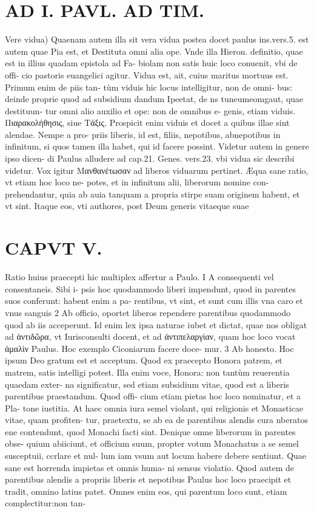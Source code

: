\documentclass{article}
\begin{document}
\begin{pages}
\section*{AD I. PAVL. AD TIM. }
\marginpar{[ p.254 ]}\pstart Vere vidua) Quaenam autem illa sit vera vidua postea docet paulus ins.vers.5. est autem quae Pia est, et Destituta omni alia ope. Vnde illa Hieron. definitio, quae est in illius quadam epistola ad Fa- biolam non satis huic loco conuenit, vbi de offi- cio pastoris euangelici agitur. Vidua est, ait, cuius maritus mortuus est. Primum enim de piis tan- tùm viduis hic locus intelligitur, non de omni- bus: deinde proprie quod ad subsidium dandum Ipeetat, de ns tuneumeomgaut, quae destituun- tur omni alio auxilio et ope: non de omnibus e- genis, etiam viduis.  \pend\pstart Πιαρακολήθησις, siue Τάξις. Prospicit enim viduis et docet a quibus illae sint alendae. Nempe a pro- priis liberis, id est, filiis, nepotibus, abnepotibus in infinitum, si quos tamen illa habet, qui id facere possint. Videtur autem in genere ipso dicen- di Paulus alludere ad cap.21. Genes. vers.23. vbi vidua sic describi videtur.  \pend\pstart Vox igitur Μανθανέτωσαν ad liberos viduarum pertinet. Æqua sane ratio, vt etiam hoc loco ne- potes, et in infinitum alii, liberorum nomine con- prehendantur, quia ab auia tanquam a propria stirpe suam originem habent, et vt sint. Itaque eos, vti authores, post Deum generis vitaeque suae  \pend
\section*{CAPVT  V. }
\marginpar{[ p.255 ]}\pstart Ratio huius praecepti hic multiplex affertur a Paulo. I A consequenti vel consentaneis. Sibi i- psis hoc quodammodo liberi impendunt, quod in parentes suos conferunt: habent enim a pa- rentibus, vt sint, et sunt cum illis vna caro et vnus sanguis 2 Ab officio, oportet liberos rependere parentibus quodammodo quod ab iis acceperunt. Id enim lex ipsa naturae iubet et dictat, quae nos obligat ad ἀντιδῶρα, vt Iurisconsulti docent, et ad ἀντιπελαργίαν, quam hoc loco vocat ἀμαλὶν Paulus. Hoc exemplo Ciconiarum facere doce- mur. 3 Ab honesto. Hoc ipsum Deo gratum est et acceptum. Quod ex praecepto Honora patrem, et matrem, satis intelligi potest. Illa enim voce, Honora: non tantùm reuerentia quaedam exter- na significatur, sed etiam subsidium vitae, quod est a liberis parentibus praestandum. Quod offi- cium etiam pietas hoc loco nominatur, et a Pla- tone iustitia. At haec omnia iura semel violant, qui religionis et Monasticae vitae, quam profiten- tur, praetextu, se ab ea de parentibus alendis cura nberatos ene contendunt, quod Monachi facti sint. Denique omne liberorum in parentes obse- quium abiiciunt, et officium suum, propter votum Monachatus a se semel susceptuii, ccrlare et nul- lum iam vsum aut locum habere debere sentiunt. Quae sane est horrenda impietas et omnis huma- ni sensus violatio. Quod autem de parentibus alendis a propriis  \pend\pstart liberis et nepotibus Paulus hoc loco praecipit et tradit, omnino latius patet. Omnes enim eos, qui parentum loco sunt, etiam complectitur:non tan-  \pend

\end{pages}
\end{document}
